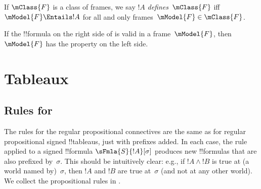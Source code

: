 \documentclass[../../../../include/open-logic-chapter]{subfiles}
\begin{document}
\begin{defn}
  If $\mClass{F}$ is a class of frames, we say $!A$
  \emph{defines}~$\mClass{F}$ iff $\mModel{F} \Entails !A$ for all and only
  frames~$\mModel{F} \in \mClass{F}$.
\end{defn}

\begin{thm}
If the !!{formula} on the right side of  is valid in a
frame~$\mModel{F}$, then $\mModel{F}$ has the property on the left
side.
\end{thm}

\section{Tableaux}

\subsection{Rules for }

The rules for the regular propositional connectives are the same as
for regular propositional signed !!{tableau}s, just with prefixes
added. In each case, the rule applied to a signed !!{formula}
$\sFmla{S}{!A}[\sigma]$ produces new !!{formula}s that are also
prefixed by~$\sigma$. This should be intuitively clear: e.g., if $!A
\land !B$ is true at (a world named by)~$\sigma$, then $!A$ and $!B$
are true at~$\sigma$ (and not at any other world). We collect the
propositional rules in .
\end{document}

